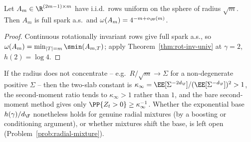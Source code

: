 \begin{corollary}\label{cor:spherical-pr}
Let $A_m\in\R^{(2m-1)\times m}$ have i.i.d.\ rows uniform on the sphere of radius
$\sqrt m$.  Then $A_m$ is full spark a.s.\ and $\omega(A_m)=4^{-m+o_\PP(m)}$.
\end{corollary}

\begin{proof}
Continuous rotationally invariant rows give full spark a.s., so
$\omega(A_m)=\min_{|T|=m}\smin(A_{m,T})$; apply Theorem~\ref{thm:rot-inv-univ} at
$\gamma=2$, $h(2)=\log4$.
\end{proof}

\begin{remark}\label{rem:radial-mixture}
If the radius does not concentrate -- e.g.\ $R/\sqrt m\to\Sigma$ for a
non-degenerate positive $\Sigma$ -- then the two-slab constant is
$\kappa_\infty=\EE[\Sigma^{-2d_\F}]/(\EE[\Sigma^{-d_\F}])^2>1$, the second-moment
ratio tends to $\kappa_\infty>1$ rather than $1$, and the bare second-moment method
gives only $\PP\{Z_t>0\}\ge\kappa_\infty^{-1}$.  Whether the exponential base
$h(\gamma)/d_\F$ nonetheless holds for genuine radial mixtures (by a boosting or
conditioning argument), or whether mixtures shift the base, is left open
(Problem~\ref{prob:radial-mixture}).
\end{remark}
